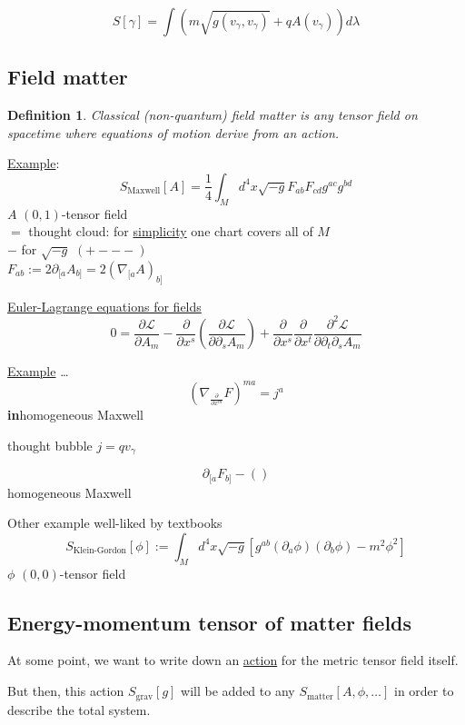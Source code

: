 \documentclass[10pt, twoside]{amsart}
\newtheorem{definition}{Definition}
\begin{document}
\begin{multicols*}{2}
\[
S[\gamma] = \int(m\sqrt{g(v_{\gamma},v_{\gamma} ) } + q A(v_{\gamma}) ) d\lambda
\]

\subsection{Field matter}

\begin{definition}
  Classical (non-quantum) field matter is any tensor field on spacetime where equations of motion derive from an action.
\end{definition}

\underline{Example}: 
\[
S_{\text{Maxwell}}[A] = \frac{1}{4}\int_M d^4x \sqrt{-g}F_{ab}F_{cd}g^{ac}g^{bd}
\]
$A$ $(0,1)$-tensor field \\
$=$ thought cloud: for \underline{simplicity} one chart covers all of $M$ \\
$-$ for $\sqrt{-g}$ $(+---)$ \\

$F_{ab} := 2\partial_{[a}A_{b]} = 2(\nabla_{[a} A)_{b]}$

\underline{Euler-Lagrange equations for fields}
\[
0 = \frac{ \partial \mathcal{L}}{ \partial A_m} - \frac{ \partial }{ \partial x^s} \left( \frac{ \partial \mathcal{L}}{ \partial \partial _s A_m } \right) + \frac{ \partial }{ \partial x^s} \frac{ \partial }{ \partial x^t} \frac{ \partial^2 \mathcal{L}}{ \partial \partial_t \partial_s A_m }
\]

\underline{Example} \dots 
\[
(\nabla_{\frac{ \partial }{ \partial x^m} }F)^{ma} = j^a
\]
\textbf{in}homogeneous Maxwell

thought bubble $j=qv_{\gamma}$

\[
\partial_{[a}F_{b]} - ()
\]
homogeneous Maxwell

Other example well-liked by textbooks
\[
S_{\text{Klein-Gordon}}[\phi] := \int_M d^4x \sqrt{-g}[g^{ab}(\partial_a \phi) (\partial_b \phi ) - m^2\phi^2]
\]
$\phi$ $(0,0)$-tensor field

\subsection{Energy-momentum tensor of matter fields}

At some point, we want to write down an \underline{action} for the metric tensor field itself.

But then, this action $S_{\text{grav}}[g]$ will be added to any $S_{\text{matter}}[A,\phi,\dots]$ in order to describe the total system.  


\end{multicols*}
\end{document}
